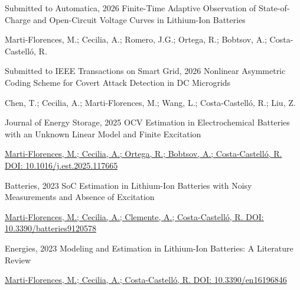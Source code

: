 

\begin{cventries}
  \cventry
  {Submitted to Automatica, 2026}
  {Finite-Time Adaptive Observation of State-of-Charge and Open-Circuit Voltage Curves in Lithium-Ion Batteries}
  {}
  {}
  {
    \begin{cvitems}
      \item {Marti-Florences, M.; Cecilia, A.; Romero, J.G.; Ortega, R.; Bobtsov, A.; Costa-Castell\'o, R.}
    \end{cvitems}
    }

  \cventry
    {Submitted to IEEE Transactions on Smart Grid, 2026}
    {Nonlinear Asymmetric Coding Scheme for Covert Attack Detection in DC Microgrids}
    {}
    {}
    {
      \begin{cvitems}
      \item {Chen, T.; Cecilia, A.; Marti-Florences, M.; Wang, L.; Costa-Castell\'o, R.; Liu, Z.}
      \end{cvitems}
    }

  \cventry
    {Journal of Energy Storage, 2025}
    {OCV Estimation in Electrochemical Batteries with an Unknown Linear Model
and Finite Excitation}
    {}
    {}
    {
      \begin{cvitems}
        \item {\href{https://doi.org/10.1016/j.est.2025.117665}{Marti-Florences, M.; Cecilia, A.; Ortega, R.; Bobtsov, A.; Costa-Castell\'o, R. DOI: 10.1016/j.est.2025.117665}}
      \end{cvitems}
    }

  \cventry
    {Batteries, 2023}
    {SoC Estimation in Lithium-Ion Batteries with Noisy Measurements and Absence of Excitation}
    {}
    {}
    {
      \begin{cvitems}
        \item {\href{https://doi.org/10.3390/batteries9120578}{Marti-Florences, M.; Cecilia, A.; Clemente, A.; Costa-Castell\'o, R. DOI: 10.3390/batteries9120578}}
      \end{cvitems}
    }

  \cventry
    {Energies, 2023}
    {Modeling and Estimation in Lithium-Ion Batteries: A Literature Review}
    {}
    {}
    {
      \begin{cvitems}
        \item {\href{https://doi.org/10.3390/en16196846}{Marti-Florences, M.; Cecilia, A.; Costa-Castell\'o, R. DOI: 10.3390/en16196846}}
      \end{cvitems}
    }

\end{cventries}

